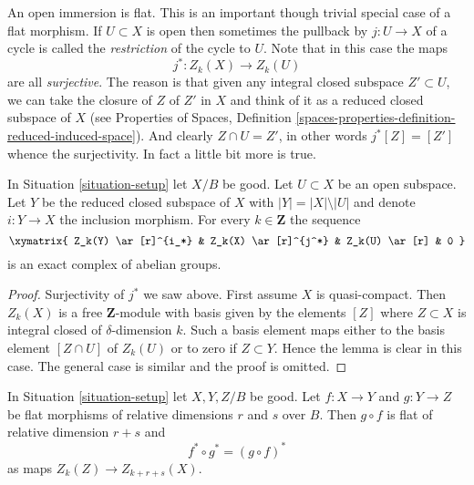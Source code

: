 \noindent
An open immersion is flat. This is an important though trivial special
case of a flat morphism. If $U \subset X$ is open then sometimes the
pullback by $j : U \to X$ of a cycle is called the {\it restriction} of the
cycle to $U$. Note that in this case the maps
$$
j^* : Z_k(X) \longrightarrow Z_k(U)
$$
are all {\it surjective}. The reason is that given any integral closed
subspace $Z' \subset U$, we can take the closure of $Z$ of $Z'$ in $X$
and think of it as a reduced closed subspace of $X$ (see
Properties of Spaces, Definition
\ref{spaces-properties-definition-reduced-induced-space}).
And clearly $Z \cap U = Z'$, in other words
$j^*[Z] = [Z']$ whence the surjectivity. In fact a little bit more
is true.

\begin{lemma}
\label{lemma-exact-sequence-open}
In Situation \ref{situation-setup} let $X/B$ be good.
Let $U \subset X$ be an open subspace. Let $Y$ be the
reduced closed subspace of $X$ with $|Y| = |X| \setminus |U|$
and denote $i : Y \to X$ the inclusion morphism.
For every $k \in \mathbf{Z}$ the sequence
$$
\xymatrix{
Z_k(Y) \ar[r]^{i_*} & Z_k(X) \ar[r]^{j^*} & Z_k(U) \ar[r] & 0
}
$$
is an exact complex of abelian groups.
\end{lemma}

\begin{proof}
Surjectivity of $j^*$ we saw above.
First assume $X$ is quasi-compact. Then $Z_k(X)$ is a free $\mathbf{Z}$-module
with basis given by the elements $[Z]$ where $Z \subset X$ is integral
closed of $\delta$-dimension $k$. Such a basis element maps
either to the basis element $[Z \cap U]$ of $Z_k(U)$
or to zero if $Z \subset Y$.
Hence the lemma is clear in this case. The general case is similar
and the proof is omitted.
\end{proof}

\begin{lemma}
\label{lemma-compose-flat-pullback}
In Situation \ref{situation-setup} let $X, Y, Z/B$ be good.
Let $f : X \to Y$ and $g : Y \to Z$ be flat morphisms of relative dimensions
$r$ and $s$ over $B$. Then $g \circ f$ is flat of relative dimension
$r + s$ and
$$
f^* \circ g^* = (g \circ f)^*
$$
as maps $Z_k(Z) \to Z_{k + r + s}(X)$.
\end{lemma}

